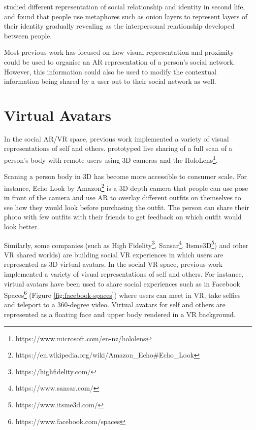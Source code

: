 \textcite{Leshed2012} studied different representation of social relationship and identity in second life, and found that people use metaphores such as onion layers to represent layers of their identity gradually revealing as the interpersonal relationship developed between people. 

\cite{Gergle2004}


Most previous work has focused on how visual representation and proximity could be used to organise an AR representation of a person's social network. However, this information could also be used to modify the contextual information being shared by a user out to their social network as well. 

\section{Virtual Avatars}

In the social AR/VR space, previous work implemented a variety of visual representations of self and others. \textcite{Fanello2016} prototyped live sharing of a full scan of a person's body with remote users using 3D cameras and the HoloLens\footnote{https://www.microsoft.com/en-nz/hololens}. 

Scaning a person body in 3D has become more accessible to consumer scale. For instance, Echo Look by Amazon\footnote{https://en.wikipedia.org/wiki/Amazon_Echo#Echo_Look} is a 3D depth camera that people can use pose in front of the camera and use AR to overlay different outfits on themselves to see how they would look before purchasing the outfit. The person can share their photo with few outfits with their friends to get feedback on which outfit would look better. 

Similarly, some companies (such as High Fidelity\footnote{https://highfidelity.com/}, Sansar\footnote{https://www.sansar.com/}, Itsme3D\footnote{https://www.itsme3d.com/}) and other VR shared worlds) are building social VR experiences in which users are represented as 3D virtual avatars. In the social VR space, previous work implemented a variety of visual representations of self and others. For instance, virtual avatars have been used to share social experiences such as in Facebook Spaces\footnote{https://www.facebook.com/spaces} (Figure \ref{fig:facebook-spaces}) where users can meet in VR, take selfies and teleport to a 360-degree video. Virtual avatars for self and others are represented as a floating face and upper body rendered in a VR background. 


